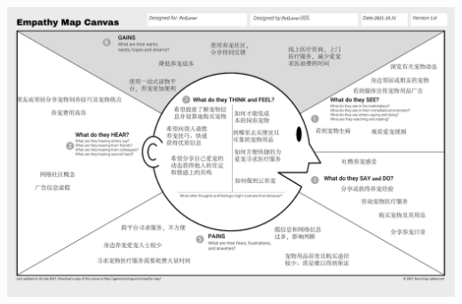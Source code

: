\documentclass[a4paper]{ctexart}
\begin{document}
\begin{center}
  \includegraphics[width=16cm]{./移情图/宠物爱好者}
\end{center}
\end{document}
